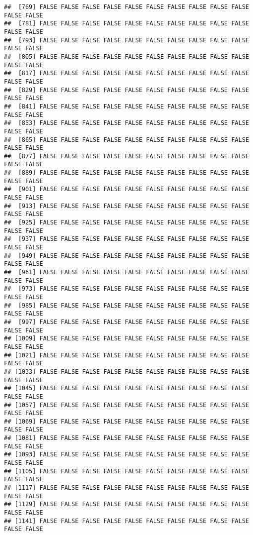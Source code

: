 \documentclass[
]{article}
\begin{document}
\begin{verbatim}
##  [769] FALSE FALSE FALSE FALSE FALSE FALSE FALSE FALSE FALSE FALSE FALSE FALSE
##  [781] FALSE FALSE FALSE FALSE FALSE FALSE FALSE FALSE FALSE FALSE FALSE FALSE
##  [793] FALSE FALSE FALSE FALSE FALSE FALSE FALSE FALSE FALSE FALSE FALSE FALSE
##  [805] FALSE FALSE FALSE FALSE FALSE FALSE FALSE FALSE FALSE FALSE FALSE FALSE
##  [817] FALSE FALSE FALSE FALSE FALSE FALSE FALSE FALSE FALSE FALSE FALSE FALSE
##  [829] FALSE FALSE FALSE FALSE FALSE FALSE FALSE FALSE FALSE FALSE FALSE FALSE
##  [841] FALSE FALSE FALSE FALSE FALSE FALSE FALSE FALSE FALSE FALSE FALSE FALSE
##  [853] FALSE FALSE FALSE FALSE FALSE FALSE FALSE FALSE FALSE FALSE FALSE FALSE
##  [865] FALSE FALSE FALSE FALSE FALSE FALSE FALSE FALSE FALSE FALSE FALSE FALSE
##  [877] FALSE FALSE FALSE FALSE FALSE FALSE FALSE FALSE FALSE FALSE FALSE FALSE
##  [889] FALSE FALSE FALSE FALSE FALSE FALSE FALSE FALSE FALSE FALSE FALSE FALSE
##  [901] FALSE FALSE FALSE FALSE FALSE FALSE FALSE FALSE FALSE FALSE FALSE FALSE
##  [913] FALSE FALSE FALSE FALSE FALSE FALSE FALSE FALSE FALSE FALSE FALSE FALSE
##  [925] FALSE FALSE FALSE FALSE FALSE FALSE FALSE FALSE FALSE FALSE FALSE FALSE
##  [937] FALSE FALSE FALSE FALSE FALSE FALSE FALSE FALSE FALSE FALSE FALSE FALSE
##  [949] FALSE FALSE FALSE FALSE FALSE FALSE FALSE FALSE FALSE FALSE FALSE FALSE
##  [961] FALSE FALSE FALSE FALSE FALSE FALSE FALSE FALSE FALSE FALSE FALSE FALSE
##  [973] FALSE FALSE FALSE FALSE FALSE FALSE FALSE FALSE FALSE FALSE FALSE FALSE
##  [985] FALSE FALSE FALSE FALSE FALSE FALSE FALSE FALSE FALSE FALSE FALSE FALSE
##  [997] FALSE FALSE FALSE FALSE FALSE FALSE FALSE FALSE FALSE FALSE FALSE FALSE
## [1009] FALSE FALSE FALSE FALSE FALSE FALSE FALSE FALSE FALSE FALSE FALSE FALSE
## [1021] FALSE FALSE FALSE FALSE FALSE FALSE FALSE FALSE FALSE FALSE FALSE FALSE
## [1033] FALSE FALSE FALSE FALSE FALSE FALSE FALSE FALSE FALSE FALSE FALSE FALSE
## [1045] FALSE FALSE FALSE FALSE FALSE FALSE FALSE FALSE FALSE FALSE FALSE FALSE
## [1057] FALSE FALSE FALSE FALSE FALSE FALSE FALSE FALSE FALSE FALSE FALSE FALSE
## [1069] FALSE FALSE FALSE FALSE FALSE FALSE FALSE FALSE FALSE FALSE FALSE FALSE
## [1081] FALSE FALSE FALSE FALSE FALSE FALSE FALSE FALSE FALSE FALSE FALSE FALSE
## [1093] FALSE FALSE FALSE FALSE FALSE FALSE FALSE FALSE FALSE FALSE FALSE FALSE
## [1105] FALSE FALSE FALSE FALSE FALSE FALSE FALSE FALSE FALSE FALSE FALSE FALSE
## [1117] FALSE FALSE FALSE FALSE FALSE FALSE FALSE FALSE FALSE FALSE FALSE FALSE
## [1129] FALSE FALSE FALSE FALSE FALSE FALSE FALSE FALSE FALSE FALSE FALSE FALSE
## [1141] FALSE FALSE FALSE FALSE FALSE FALSE FALSE FALSE FALSE FALSE FALSE FALSE

\end{verbatim}
\end{document}
